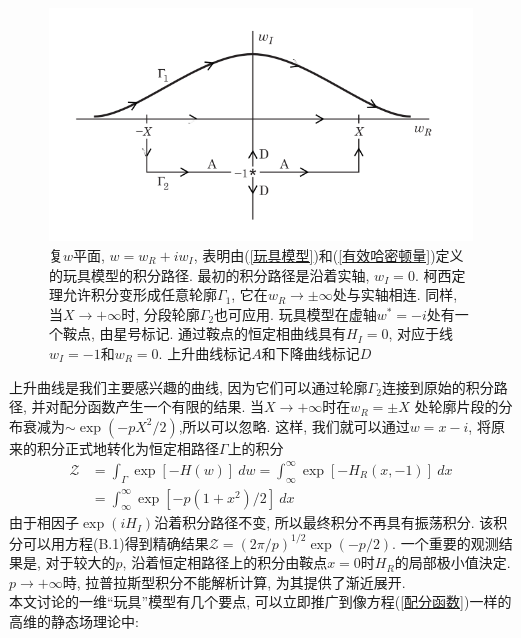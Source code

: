 \begin{figure}[H]
      \centering
      \includegraphics[width=12cm]{Contents/chapter5/figures/1.png}
      \caption{复$w$平面, $w =w_R + iw_I$, 表明由(\ref{玩具模型})和(\ref{有效哈密顿量})定义的玩具模型的积分路径. 最初的积分路径是沿着实轴, $w_I=0$. 柯西定理允许积分变形成任意轮廓$\Gamma_1$, 它在$w_R \rightarrow \pm \infty $处与实轴相连. 同样, 当$X \rightarrow +\infty$时, 分段轮廓$\Gamma_2$也可应用. 玩具模型在虚轴$w^*= -i$处有一个鞍点, 由星号标记. 通过鞍点的恒定相曲线具有$H_I=0$, 对应于线$w_I=-1$和$w_R=0$. 上升曲线标记$A$和下降曲线标记$D$}
      \label{复平面w}
\end{figure}
上升曲线是我们主要感兴趣的曲线, 因为它们可以通过轮廓$\Gamma_2$连接到原始的积分路径, 并对配分函数产生一个有限的结果. 当$ X \rightarrow +\infty$时在$w_R=\pm X$ 处轮廓片段的分布衰减为$\sim \exp(-pX^2/2)$,所以可以忽略. 这样, 我们就可以通过$w =x -i$, 将原来的积分正式地转化为恒定相路径$\Gamma$上的积分\\
\begin{equation}
\begin{aligned}
\mathcal{Z} &= \int_\Gamma \exp[-H(w)] \ dw = \int_\infty^\infty \exp[-H_R(x,-1)] \ dx\\
& =\int_\infty^\infty \exp[-p(1+x^2)/2] \ dx \label{恒定相路径积分}
\end{aligned}
\end{equation}
由于相因子$\exp(iH_I)$沿着积分路径不变, 所以最终积分不再具有振荡积分. 该积分可以用方程(B.1)得到精确结果$\mathcal{Z}=(2\pi/p)^{1/2}\exp(-p/2)$. 一个重要的观测结果是, 对于较大的$p$, 沿着恒定相路径上的积分由鞍点$x=0$时$H_R$的局部极小值決定. $p\rightarrow +\infty$時, 拉普拉斯型积分不能解析计算, 为其提供了渐近展开. \\

本文讨论的一维“玩具”模型有几个要点, 可以立即推广到像方程(\ref{配分函数})一样的高维的静态场理论中:\\

